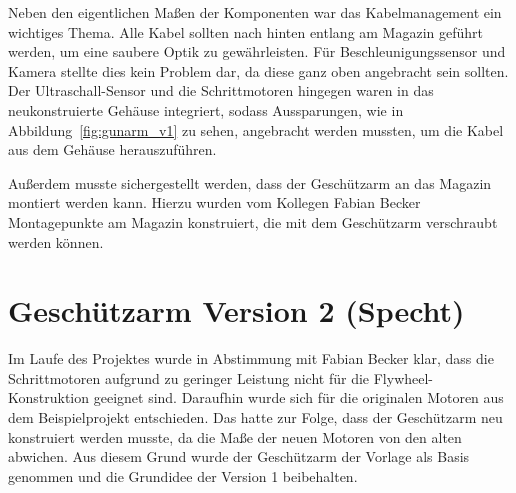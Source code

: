 Neben den eigentlichen Maßen der Komponenten war das Kabelmanagement ein wichtiges Thema. Alle Kabel sollten nach hinten entlang am Magazin geführt werden, um eine saubere Optik zu gewährleisten. Für Beschleunigungssensor und Kamera stellte dies kein Problem dar, da diese ganz oben angebracht sein sollten. Der Ultraschall-Sensor und die Schrittmotoren hingegen waren in das neukonstruierte Gehäuse integriert, sodass Aussparungen, wie in Abbildung~\ref{fig:gunarm_v1} zu sehen, angebracht werden mussten, um die Kabel aus dem Gehäuse herauszuführen.

Außerdem musste sichergestellt werden, dass der Geschützarm an das Magazin montiert werden kann. Hierzu wurden vom Kollegen Fabian Becker Montagepunkte am Magazin konstruiert, die mit dem Geschützarm verschraubt werden können.

\section{Geschützarm Version 2 (Specht)}

Im Laufe des Projektes wurde in Abstimmung mit Fabian Becker klar, dass die Schrittmotoren aufgrund zu geringer Leistung nicht für die Flywheel-Konstruktion geeignet sind. Daraufhin wurde sich für die originalen Motoren aus dem Beispielprojekt entschieden. Das hatte zur Folge, dass der Geschützarm neu konstruiert werden musste, da die Maße der neuen Motoren von den alten abwichen. Aus diesem Grund wurde der Geschützarm der Vorlage als Basis genommen und die Grundidee der Version 1 beibehalten.

